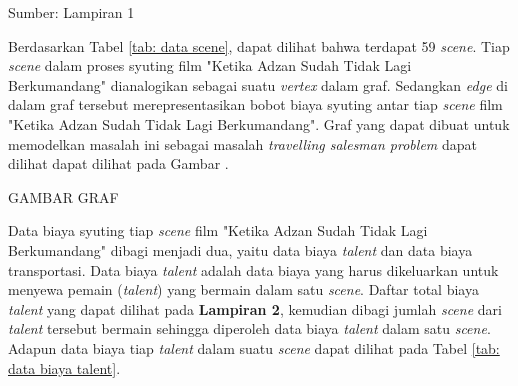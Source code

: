 {    \vspace{-8mm}
    \begin{flushright}
        Sumber: Lampiran 1
    \end{flushright}

    Berdasarkan Tabel \ref{tab: data scene}, dapat dilihat bahwa terdapat 59 \textit{scene}.
    Tiap \textit{scene} dalam proses syuting film "Ketika Adzan Sudah Tidak Lagi Berkumandang" dianalogikan sebagai
    suatu \textit{vertex} dalam graf.
    Sedangkan \textit{edge} di dalam graf tersebut merepresentasikan bobot biaya syuting antar tiap \textit{scene} film "Ketika
    Adzan Sudah Tidak Lagi Berkumandang".
    Graf yang dapat dibuat untuk memodelkan masalah ini sebagai masalah \textit{travelling salesman problem} dapat dilihat
    dapat dilihat pada Gambar .

    \begin{center}
        GAMBAR GRAF
    \end{center}

    Data biaya syuting tiap \textit{scene} film "Ketika Adzan Sudah Tidak Lagi Berkumandang" dibagi menjadi dua,
    yaitu data biaya \textit{talent} dan data biaya transportasi.
    Data biaya \textit{talent} adalah data biaya yang harus dikeluarkan untuk menyewa pemain (\textit{talent}) yang bermain dalam satu \textit{scene}.
    Daftar total biaya \textit{talent} yang dapat dilihat pada \textbf{Lampiran 2}, kemudian dibagi jumlah \textit{scene} dari \textit{talent} tersebut bermain sehingga
    diperoleh data biaya \textit{talent} dalam satu \textit{scene}.
    Adapun data biaya tiap \textit{talent} dalam suatu \textit{scene} dapat dilihat pada Tabel \ref{tab: data biaya talent}.

}
